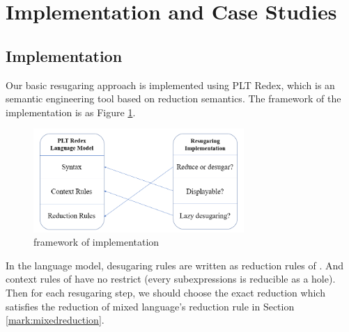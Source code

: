 \section{Implementation and Case Studies}
\label{sec5}

\subsection{Implementation}

Our basic resugaring approach is implemented using PLT Redex\cite{SEwPR}, which is an semantic engineering tool based on reduction semantics\cite{reduction}. The framework of the implementation is as Figure \ref{fig:frame}.
\begin{figure}[thb]
	\centering
	\includegraphics[width=8cm]{images/frame.png}
	\caption{framework of implementation}
	\label{fig:frame}
\end{figure}

In the language model, desugaring rules are written as reduction rules of . And context rules of  have no restrict (every subexpressions is reducible as a hole). Then for each resugaring step, we should choose the exact reduction which satisfies the reduction of mixed language's reduction rule  in Section \ref{mark:mixedreduction}.

